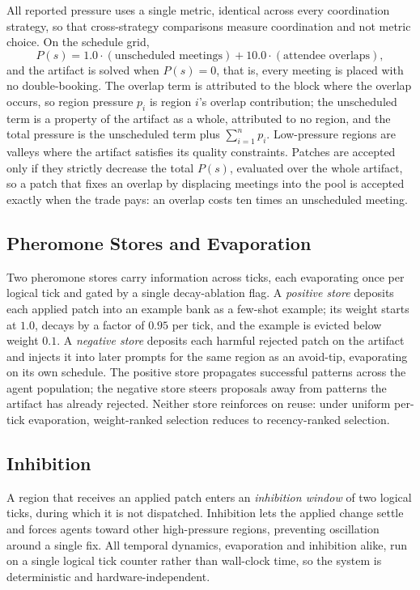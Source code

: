 All reported pressure uses a single metric, identical across every coordination strategy, so that cross-strategy comparisons measure coordination and not metric choice. On the schedule grid,
\[
P(s) = 1.0 \cdot (\text{unscheduled meetings}) + 10.0 \cdot (\text{attendee overlaps}),
\]
and the artifact is solved when $P(s) = 0$, that is, every meeting is placed with no double-booking. The overlap term is attributed to the block where the overlap occurs, so region pressure $p_i$ is region $i$'s overlap contribution; the unscheduled term is a property of the artifact as a whole, attributed to no region, and the total pressure is the unscheduled term plus $\sum_{i=1}^{n} p_i$. Low-pressure regions are valleys where the artifact satisfies its quality constraints. Patches are accepted only if they strictly decrease the total $P(s)$, evaluated over the whole artifact, so a patch that fixes an overlap by displacing meetings into the pool is accepted exactly when the trade pays: an overlap costs ten times an unscheduled meeting.

\subsection{Pheromone Stores and Evaporation}

Two pheromone stores carry information across ticks, each evaporating once per logical tick and gated by a single decay-ablation flag. A \emph{positive store} deposits each applied patch into an example bank as a few-shot example; its weight starts at $1.0$, decays by a factor of $0.95$ per tick, and the example is evicted below weight $0.1$. A \emph{negative store} deposits each harmful rejected patch on the artifact and injects it into later prompts for the same region as an avoid-tip, evaporating on its own schedule. The positive store propagates successful patterns across the agent population; the negative store steers proposals away from patterns the artifact has already rejected. Neither store reinforces on reuse: under uniform per-tick evaporation, weight-ranked selection reduces to recency-ranked selection.

\subsection{Inhibition}

A region that receives an applied patch enters an \emph{inhibition window} of two logical ticks, during which it is not dispatched. Inhibition lets the applied change settle and forces agents toward other high-pressure regions, preventing oscillation around a single fix. All temporal dynamics, evaporation and inhibition alike, run on a single logical tick counter rather than wall-clock time, so the system is deterministic and hardware-independent.

